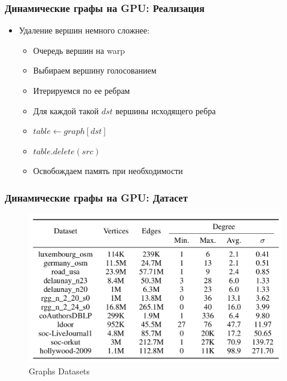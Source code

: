 \documentclass[xcolor=table,english]{beamer}
\begin{document}
\begin{frame}[fragile] \frametitle{Динамические графы на GPU: Реализация}
    \begin{itemize}
        \item Удаление вершин немного сложнее:
        {
            \begin{itemize}
                \item Очередь вершин на warp
                \item Выбираем вершину голосованием
                \item Итерируемся по ее ребрам
                \item Для каждой такой $dst$ вершины исходящего ребра
                \item $table \gets graph[dst]$
                \item $table.delete(src)$
                \item Освобождаем память при необходимости
            \end{itemize}
        }
    \end{itemize}
\end{frame}

\begin{frame}[fragile] \frametitle{Динамические графы на GPU: Датасет}
    \begin{minipage}[m]{0.95\linewidth}
        \begin{figure}
            \centering
            \includegraphics[width=\textwidth]{pictures/dataset.png}
            \caption{Graphs Datasets}
            \label{fig:dataset}
        \end{figure}
    \end{minipage}\hfill
\end{frame}
\end{document}
